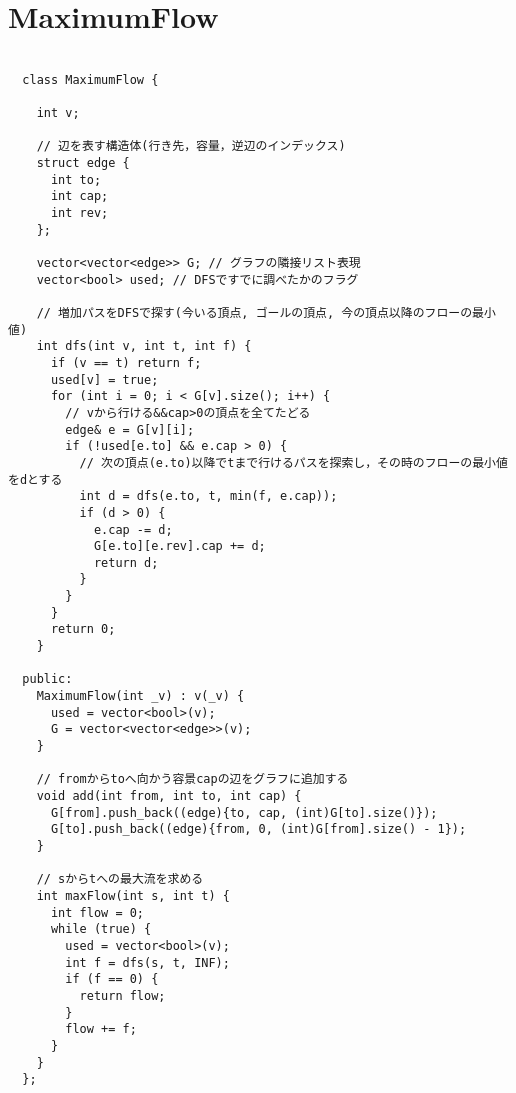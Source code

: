 \documentclass{jsarticle}
\begin{document}
\color{white}
\section{MaximumFlow}
\color{black}
\begin{lstlisting}[caption=MaximumFlow]

  class MaximumFlow {
  
    int v;
  
    // 辺を表す構造体(行き先，容量，逆辺のインデックス)
    struct edge {
      int to;
      int cap;
      int rev;
    };
  
    vector<vector<edge>> G; // グラフの隣接リスト表現
    vector<bool> used; // DFSですでに調べたかのフラグ
  
    // 増加パスをDFSで探す(今いる頂点, ゴールの頂点, 今の頂点以降のフローの最小値)
    int dfs(int v, int t, int f) {
      if (v == t) return f;
      used[v] = true;
      for (int i = 0; i < G[v].size(); i++) {
        // vから行ける&&cap>0の頂点を全てたどる
        edge& e = G[v][i];
        if (!used[e.to] && e.cap > 0) {
          // 次の頂点(e.to)以降でtまで行けるパスを探索し，その時のフローの最小値をdとする
          int d = dfs(e.to, t, min(f, e.cap));
          if (d > 0) {
            e.cap -= d;
            G[e.to][e.rev].cap += d;
            return d;
          }
        }
      }
      return 0;
    }
  
  public:
    MaximumFlow(int _v) : v(_v) {
      used = vector<bool>(v);
      G = vector<vector<edge>>(v);
    }
  
    // fromからtoへ向かう容景capの辺をグラフに追加する
    void add(int from, int to, int cap) {
      G[from].push_back((edge){to, cap, (int)G[to].size()});
      G[to].push_back((edge){from, 0, (int)G[from].size() - 1});
    }
  
    // sからtへの最大流を求める
    int maxFlow(int s, int t) {
      int flow = 0;
      while (true) {
        used = vector<bool>(v);
        int f = dfs(s, t, INF);
        if (f == 0) {
          return flow;
        }
        flow += f;
      }
    }
  };
  

\end{lstlisting}

\color{white}
\end{document}
